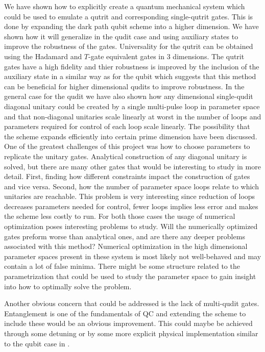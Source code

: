 We have shown how to explicitly create a quantum mechanical system which could be used to emulate a qutrit and corresponding single-qutrit gates. This is done by expanding the dark path qubit scheme \cite{darkpath} into a higher dimension. We have shown how it will generalize in the qudit case and using auxiliary states to improve the robustness of the gates. Universality for the qutrit can be obtained using the Hadamard and $T$-gate equivalent gates in 3 dimensions. The qutrit gates have a high fidelity and thier robustness is improved by the inclusion of the auxiliary state in a similar way as for the qubit \cite{darkpath} which suggests that this method can be beneficial for higher dimensional qudits to improve robustness. In the general case for the qudit we have also shown how any dimensional single-qudit diagonal unitary could be created by a single multi-pulse loop in parameter space and that non-diagonal unitaries scale linearly at worst in the number of loops and parameters required for control of each loop scale linearly. The possibility that the scheme expands efficiently into certain prime dimension have been discussed.
\\

One of the greatest challenges of this project was how to choose parameters to replicate the unitary gates. Analytical construction of any diagonal unitary is solved, but there are many other gates that would be interesting to study in more detail. First, finding how different constraints impact the construction of gates and vice versa. Second, how the number of parameter space loops relate to which unitaries are reachable. This problem is very interesting since reduction of loops decreases parameters needed for control, fewer loops implies less error and makes the scheme less costly to run. For both those cases the usage of numerical optimization poses interesting problems to study. Will the numerically optimized gates preform worse than analytical ones, and are there any deeper problems associated with this method? Numerical optimization in the high dimensional parameter spaces present in these system is most likely not well-behaved and may contain a lot of false minima. There might be some structure related to the parametrization that could be used to study the parameter space to gain insight into how to optimally solve the problem.
 
Another obvious concern that could be addressed is the lack of multi-qudit gates. Entanglement is one of the fundamentals of QC and extending the scheme to include these would be an obvious improvement. This could maybe be achieved through some detuning or by some more explicit physical implementation similar to the qubit case in \cite{darkpath}.

